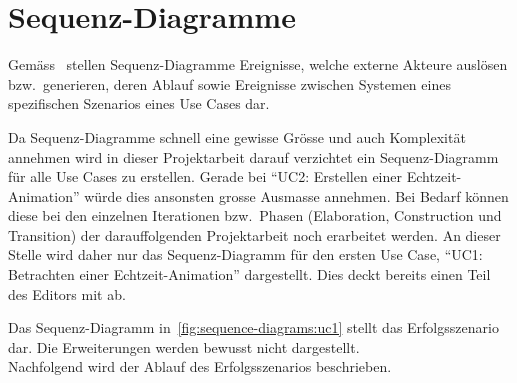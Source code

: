 
\section{Sequenz-Diagramme}
\label{sec:sequence-diagrams}

Gemäss~\cite{larman_applying_2004} stellen Sequenz-Diagramme Ereignisse, welche
externe Akteure auslösen bzw.\ generieren, deren Ablauf sowie Ereignisse
zwischen Systemen eines spezifischen Szenarios eines Use Cases dar.

Da Sequenz-Diagramme schnell eine gewisse Grösse und auch Komplexität annehmen
wird in dieser Projektarbeit darauf verzichtet ein Sequenz-Diagramm für alle
Use Cases zu erstellen. Gerade bei ``UC2: Erstellen einer Echtzeit-Animation''
würde dies ansonsten grosse Ausmasse annehmen. Bei Bedarf können diese bei den
einzelnen Iterationen bzw.\ Phasen (Elaboration, Construction und Transition)
der darauffolgenden Projektarbeit noch erarbeitet werden. An dieser Stelle wird
daher nur das Sequenz-Diagramm für den ersten Use Case, ``UC1: Betrachten einer
Echtzeit-Animation'' dargestellt. Dies deckt bereits einen Teil des Editors mit
ab.

Das Sequenz-Diagramm in~\autoref{fig:sequence-diagrams:uc1} stellt das Erfolgsszenario
dar. Die Erweiterungen werden bewusst nicht dargestellt.\\
Nachfolgend wird der Ablauf des Erfolgsszenarios beschrieben.

